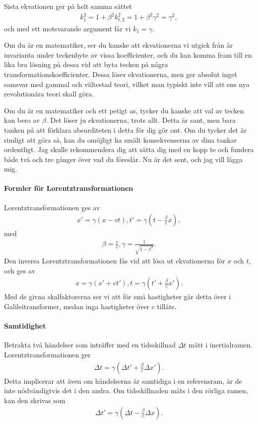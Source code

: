Sista ekvationen ger på helt samma sättet
\begin{align*}
	k_{1}^{2} = 1 + \beta^{2}k_{t, 2}^{2} = 1 + \beta^{2}\gamma^{2} = \gamma^{2},
\end{align*}
och med ett motsvarande argument får vi $k_{1} = \gamma$.

Om du är en matematiker, ser du kanske att ekvationerna vi utgick från är invarianta under teckenbyte av vissa koefficienter, och du kan komma fram till en lika bra lösning på dessa vid att byta tecken på några transformationskoefficienter. Dessa löser ekvationerna, men ger absolut inget samsvar med gammal och vältestad teori, vilket man typiskt inte vill att ens nya revolutionära teori skall göra.

Om du är en matematiker och ett petigt as, tycker du kanske att val av tecken kan bero av $\beta$. Det löser ju ekvationerna, trots allt. Detta är sant, men bara tanken på att förklara absurditeten i detta för dig gör ont. Om du tycker det är rimligt att göra så, kan du omöjligt ha smält konsekvenserna av dina tankar ordentligt. Jag skulle rekommendera dig att sätta dig med en kopp te och fundera både två och tre gånger över vad du föreslår. Nu är det sent, och jag vill lägga mig.

\paragraph{Formler för Lorentztransformationen}
Lorentztransformationen ges av
\begin{align*}
	x' = \gamma(x - vt), t' = \gamma\left(t - \frac{\beta}{c}x\right),
\end{align*}
med
\begin{align*}
	\beta = \frac{v}{c}, \gamma = \frac{1}{\sqrt{1 - \beta^{2}}}.
\end{align*}
Den inversa Lorentztransformationen fås vid att lösa ut ekvationerna för $x$ och $t$, och ges av
\begin{align*}
	x = \gamma(x' + vt'), t = \gamma\left(t' + \frac{\beta}{c}x'\right).
\end{align*}
Med de givna skalfaktorerna ser vi att för små hastigheter går detta över i Galileitransformer, medan inga hastigheter över $c$ tillåts.

\paragraph{Samtidighet}
Betrakta två händelser som inträffer med en tidsskillnad $\Delta t$ mätt i inertialramen. Lorentztransformationen ger
\begin{align*}
	\Delta t = \gamma(\Delta t' + \frac{\beta}{c}\Delta x').
\end{align*}
Detta implicerar att även om händelserna är samtidiga i en referensram, är de inte nödvändigtvis det i den andra. Om tidsskillnaden mäts i den rörliga ramen, kan den skrivas som
\begin{align*}
	\Delta t' = \gamma(\Delta t - \frac{\beta}{c}\Delta x).
\end{align*}

